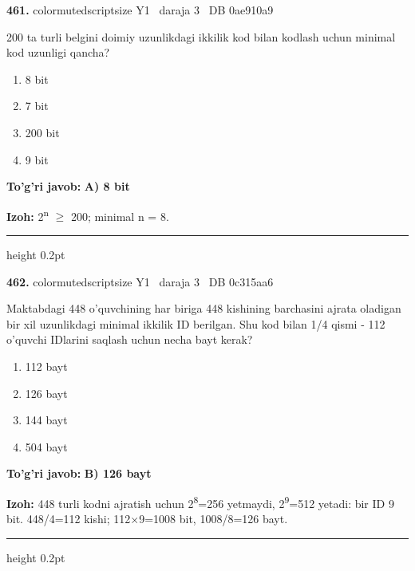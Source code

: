 \documentclass[10pt,a4paper,oneside]{article}
\begin{document}
\noindent\textbf{\color{ink}461.}  {color{muted}scriptsize Y1 \textbullet\ daraja 3 \textbullet\ DB 0ae910a9}
\par
200 ta turli belgini doimiy uzunlikdagi ikkilik kod bilan kodlash uchun minimal kod uzunligi qancha?
\begin{enumerate}[label=\Alph*),leftmargin=9mm]
\item 8 bit
\item 7 bit
\item 200 bit
\item 9 bit
\end{enumerate}
\begin{tcolorbox}[enhanced,breakable,colback=teal!4,colframe=teal!50!black,boxrule=0.5pt,arc=1.1mm,left=3mm,right=3mm,top=1.7mm,bottom=1.7mm,before skip=2mm,after skip=2mm]
\textbf{\color{teal}To'g'ri javob:} \textbf{A) 8 bit}
\par\smallskip
\textbf{Izoh:} 2\textsuperscript{n} \ensuremath{\geq} 200; minimal n = 8.
\end{tcolorbox}
\vspace{2mm}\hrule height 0.2pt \vspace{3mm}

\noindent\textbf{\color{ink}462.}  {color{muted}scriptsize Y1 \textbullet\ daraja 3 \textbullet\ DB 0c315aa6}
\par
Maktabdagi 448 o'quvchining har biriga 448 kishining barchasini ajrata oladigan bir xil uzunlikdagi minimal ikkilik ID berilgan. Shu kod bilan 1/4 qismi - 112 o'quvchi IDlarini saqlash uchun necha bayt kerak?
\begin{enumerate}[label=\Alph*),leftmargin=9mm]
\item 112 bayt
\item 126 bayt
\item 144 bayt
\item 504 bayt
\end{enumerate}
\begin{tcolorbox}[enhanced,breakable,colback=teal!4,colframe=teal!50!black,boxrule=0.5pt,arc=1.1mm,left=3mm,right=3mm,top=1.7mm,bottom=1.7mm,before skip=2mm,after skip=2mm]
\textbf{\color{teal}To'g'ri javob:} \textbf{B) 126 bayt}
\par\smallskip
\textbf{Izoh:} 448 turli kodni ajratish uchun 2\textsuperscript{8}=256 yetmaydi, 2\textsuperscript{9}=512 yetadi: bir ID 9 bit. 448/4=112 kishi; 112\ensuremath{\times}9=1008 bit, 1008/8=126 bayt.
\end{tcolorbox}
\vspace{2mm}\hrule height 0.2pt \vspace{3mm}
\end{document}
